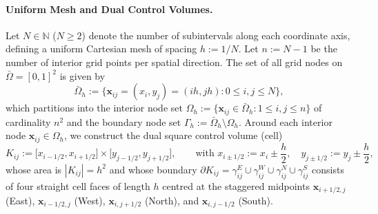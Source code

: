\documentclass[11pt,a4paper]{article}
\theoremstyle{definition}
\theoremstyle{remark}
\begin{document}
\paragraph{Uniform Mesh and Dual Control Volumes.}
Let $N \in \mathbb{N}$ ($N \ge 2$) denote the number of subintervals along each coordinate axis, defining a uniform Cartesian mesh of spacing $h := 1/N$. Let $n := N - 1$ be the number of interior grid points per spatial direction. The set of all grid nodes on $\bar{\Omega} = [0,1]^2$ is given by
\begin{equation}
	\bar{\Omega}_h := \bigl\{ \bm{x}_{ij} = (x_i, y_j) = (ih, jh) : 0 \le i, j \le N \bigr\},
	\label{eq:mesh_def}
\end{equation}
which partitions into the interior node set $\Omega_h := \{ \bm{x}_{ij} \in \bar{\Omega}_h : 1 \le i, j \le n \}$ of cardinality $n^2$ and the boundary node set $\Gamma_h := \bar{\Omega}_h \setminus \Omega_h$. Around each interior node $\bm{x}_{ij} \in \Omega_h$, we construct the dual square control volume (cell)
\begin{equation}
	K_{ij} := \bigl[x_{i-1/2}, x_{i+1/2}\bigr] \times \bigl[y_{j-1/2}, y_{j+1/2}\bigr], \qquad \text{with } x_{i\pm 1/2} := x_i \pm \frac{h}{2}, \quad y_{j\pm 1/2} := y_j \pm \frac{h}{2},
	\label{eq:control_vol}
\end{equation}
whose area is $|K_{ij}| = h^2$ and whose boundary $\partial K_{ij} = \gamma_{ij}^E \cup \gamma_{ij}^W \cup \gamma_{ij}^N \cup \gamma_{ij}^S$ consists of four straight cell faces of length $h$ centred at the staggered midpoints $\bm{x}_{i+1/2,j}$ (East), $\bm{x}_{i-1/2,j}$ (West), $\bm{x}_{i,j+1/2}$ (North), and $\bm{x}_{i,j-1/2}$ (South).
\end{document}
